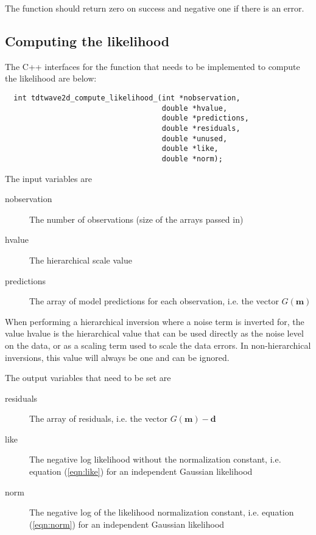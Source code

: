 \documentclass[a4paper,12pt]{article}
\begin{document}
The function should return zero on success and negative one if there
is an error.

\subsection{Computing the likelihood}

The C++ interfaces for the function that needs to be implemented to
compute the likelihood are below:

\begin{verbatim}
  int tdtwave2d_compute_likelihood_(int *nobservation,
                                    double *hvalue,
                                    double *predictions,
                                    double *residuals,
                                    double *unused,
                                    double *like,
                                    double *norm);
\end{verbatim}

The input variables are

\begin{description}
\item[nobservation] The number of observations (size of the arrays passed in)
\item[hvalue] The hierarchical scale value
\item[predictions] The array of model predictions for each observation, i.e. the vector $G(\mathbf{m})$
\end{description}

When performing a hierarchical inversion where a noise term is
inverted for, the value hvalue is the hierarchical value that can be
used directly as the noise level on the data, or as a scaling term
used to scale the data errors. In non-hierarchical inversions, this value
will always be one and can be ignored.

The output variables that need to be set are

\begin{description}
\item[residuals] The array of residuals, i.e. the vector $G(\mathbf{m}) - \mathbf{d}$
\item[like] The negative log likelihood without the normalization constant, i.e. equation (\ref{eqn:like})
  for an independent Gaussian likelihood
\item[norm] The negative log of the likelihood normalization constant, i.e. equation (\ref{eqn:norm})
  for an independent Gaussian likelihood
\end{description}
\end{document}
